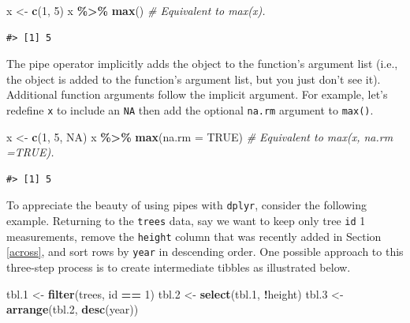 \documentclass[
  11pt,
]{krantz}
\newenvironment{Shaded}{\begin{snugshade}}{\end{snugshade}}
\newcommand{\CommentTok}[1]{\textcolor[rgb]{0.56,0.35,0.01}{\textit{#1}}}
\newcommand{\DataTypeTok}[1]{\textcolor[rgb]{0.13,0.29,0.53}{#1}}
\newcommand{\DecValTok}[1]{\textcolor[rgb]{0.00,0.00,0.81}{#1}}
\newcommand{\FloatTok}[1]{\textcolor[rgb]{0.00,0.00,0.81}{#1}}
\newcommand{\KeywordTok}[1]{\textcolor[rgb]{0.13,0.29,0.53}{\textbf{#1}}}
\newcommand{\NormalTok}[1]{#1}
\newcommand{\OperatorTok}[1]{\textcolor[rgb]{0.81,0.36,0.00}{\textbf{#1}}}
\newcommand{\OtherTok}[1]{\textcolor[rgb]{0.56,0.35,0.01}{#1}}
\newcommand{\StringTok}[1]{\textcolor[rgb]{0.31,0.60,0.02}{#1}}
\theoremstyle{definition}
\theoremstyle{definition}
\theoremstyle{definition}
\theoremstyle{definition}
\theoremstyle{remark}
\begin{document}
\begin{Shaded}
\begin{Highlighting}[]
\NormalTok{x \textless{}{-}}\StringTok{ }\KeywordTok{c}\NormalTok{(}\DecValTok{1}\NormalTok{, }\DecValTok{5}\NormalTok{)}
\NormalTok{x }\OperatorTok{\%\textgreater{}\%}\StringTok{ }\KeywordTok{max}\NormalTok{() }\CommentTok{\# Equivalent to max(x).}
\end{Highlighting}
\end{Shaded}

\begin{verbatim}
#> [1] 5
\end{verbatim}

The pipe operator implicitly adds the object to the function's argument list (i.e., the object is added to the function's argument list, but you just don't see it). Additional function arguments follow the implicit argument. For example, let's redefine \texttt{x} to include an \texttt{NA} then add the optional \texttt{na.rm} argument to \texttt{max()}.

\begin{Shaded}
\begin{Highlighting}[]
\NormalTok{x \textless{}{-}}\StringTok{ }\KeywordTok{c}\NormalTok{(}\DecValTok{1}\NormalTok{, }\DecValTok{5}\NormalTok{, }\OtherTok{NA}\NormalTok{)}
\NormalTok{x }\OperatorTok{\%\textgreater{}\%}\StringTok{ }\KeywordTok{max}\NormalTok{(}\DataTypeTok{na.rm =} \OtherTok{TRUE}\NormalTok{) }\CommentTok{\# Equivalent to max(x, na.rm =TRUE).}
\end{Highlighting}
\end{Shaded}

\begin{verbatim}
#> [1] 5
\end{verbatim}

To appreciate the beauty of using pipes with \texttt{dplyr}, consider the following example. Returning to the \texttt{trees} data, say we want to keep only tree \texttt{id} 1 measurements, remove the \texttt{height} column that was recently added in Section \ref{across}, and sort rows by \texttt{year} in descending order. One possible approach to this three-step process is to create intermediate tibbles as illustrated below.

\begin{Shaded}
\begin{Highlighting}[]
\NormalTok{tbl}\FloatTok{.1}\NormalTok{ \textless{}{-}}\StringTok{ }\KeywordTok{filter}\NormalTok{(trees, id }\OperatorTok{==}\StringTok{ }\DecValTok{1}\NormalTok{)}
\NormalTok{tbl}\FloatTok{.2}\NormalTok{ \textless{}{-}}\StringTok{ }\KeywordTok{select}\NormalTok{(tbl}\FloatTok{.1}\NormalTok{, }\OperatorTok{!}\NormalTok{height)}
\NormalTok{tbl}\FloatTok{.3}\NormalTok{ \textless{}{-}}\StringTok{ }\KeywordTok{arrange}\NormalTok{(tbl}\FloatTok{.2}\NormalTok{, }\KeywordTok{desc}\NormalTok{(year))}
\end{Highlighting}
\end{Shaded}
\end{document}

